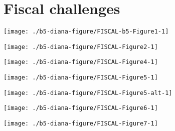 \documentclass[tikz]{standalone}\usepackage[]{graphicx}\usepackage[]{color}
\newenvironment{knitrout}{}{} %
\begin{document}
\section{Fiscal challenges}



\begin{knitrout}
\color{fgcolor}
\texttt{[image: ./b5-diana-figure/FISCAL-b5-Figure1-1]} 

\end{knitrout}

\begin{knitrout}
\color{fgcolor}
\texttt{[image: ./b5-diana-figure/FISCAL-Figure2-1]} 

\end{knitrout}

\begin{knitrout}
\color{fgcolor}
\texttt{[image: ./b5-diana-figure/FISCAL-Figure4-1]} 

\end{knitrout}

\begin{knitrout}
\color{fgcolor}
\texttt{[image: ./b5-diana-figure/FISCAL-Figure5-1]} 

\end{knitrout}

\begin{knitrout}
\color{fgcolor}
\texttt{[image: ./b5-diana-figure/FISCAL-Figure5-alt-1]} 

\end{knitrout}

\begin{knitrout}
\color{fgcolor}
\texttt{[image: ./b5-diana-figure/FISCAL-Figure6-1]} 

\end{knitrout}

\begin{knitrout}
\color{fgcolor}
\texttt{[image: ./b5-diana-figure/FISCAL-Figure7-1]} 

\end{knitrout}
\end{document}
